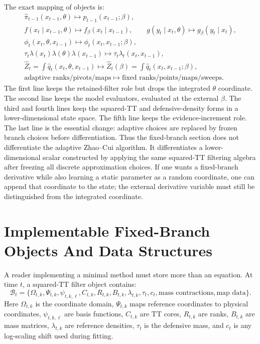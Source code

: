 \documentclass[11pt]{article}
\begin{document}
The exact mapping of objects is:
\[
\begin{gathered}
\widehat\pi_{t-1}(x_{t-1},\theta)
\mapsto
\widehat p_{t-1}(x_{t-1};\beta),\\
f(x_t\mid x_{t-1},\theta)\mapsto f_\beta(x_t\mid x_{t-1}),
\qquad
g(y_t\mid x_t,\theta)\mapsto g_\beta(y_t\mid x_t),\\
\phi_t(x_t,\theta,x_{t-1})
\mapsto
\phi_t(x_t,x_{t-1};\beta),\\
\tau_t\lambda(x_t)\lambda(\theta)\lambda(x_{t-1})
\mapsto
\tau_t\lambda_t(x_t,x_{t-1}),\\
\widehat Z_t
=
\int\widehat q_t(x_t,\theta,x_{t-1})
\mapsto
\widehat Z_t(\beta)
=
\int\widehat q_t(x_t,x_{t-1};\beta),\\
\text{adaptive ranks/pivots/maps}
\mapsto
\text{fixed ranks/points/maps/sweeps}.
\end{gathered}
\tag{R3}
\]
The first line keeps the retained-filter role but drops the integrated
\(\theta\) coordinate.  The second line keeps the model evaluators, evaluated at
the external \(\beta\).  The third and fourth lines keep the squared-TT and
defensive-density forms in a lower-dimensional state space.  The fifth line
keeps the evidence-increment role.  The last line is the essential change:
adaptive choices are replaced by frozen branch choices before differentiation.
Thus the fixed-branch section does not differentiate the adaptive Zhao--Cui
algorithm.  It differentiates a lower-dimensional scalar constructed by applying
the same squared-TT filtering algebra after freezing all discrete approximation
choices.  If one wants a fixed-branch derivative while also learning a static
parameter as a random coordinate, one can append that coordinate to the state;
the external derivative variable must still be distinguished from the
integrated coordinate.

\section{Implementable Fixed-Branch Objects And Data Structures}

A reader implementing a minimal method must store more than an equation.  At
time \(t\), a squared-TT filter object contains:
\[
    \mathcal B_t
    =
    \{
    \Omega_{t,k},\Psi_{t,k},\psi_{t,k,\ell},C_{t,k},
    R_{t,k},B_{t,k},\lambda_{t,k},\tau_t,c_t,
    \text{mass contractions},\text{map data}
    \}.
\]
Here \(\Omega_{t,k}\) is the coordinate domain, \(\Psi_{t,k}\) maps reference
coordinates to physical coordinates, \(\psi_{t,k,\ell}\) are basis functions,
\(C_{t,k}\) are TT cores, \(R_{t,k}\) are ranks, \(B_{t,k}\) are mass matrices,
\(\lambda_{t,k}\) are reference densities, \(\tau_t\) is the defensive mass, and
\(c_t\) is any log-scaling shift used during fitting.
\end{document}
